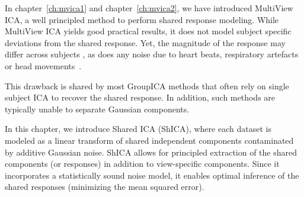 In chapter~\ref{ch:mvica1} and chapter~\ref{ch:mvica2}, we have introduced MultiView ICA, a well principled method to perform shared response modeling. 
While MultiView ICA yields good practical results, it does not model subject specific deviations from the shared
response. Yet, the magnitude of the response may differ across subjects \cite{penny2007random}, as does any noise due to heart beats, respiratory artefacts or head movements~\cite{liu2016noise}.
%

This drawback is shared by most GroupICA methods that often rely on single
subject ICA to recover the shared response. In addition, such methods are typically unable to separate Gaussian components.



In this chapter, we introduce Shared ICA (ShICA), where each dataset is modeled as a linear transform of shared independent components contaminated by additive Gaussian noise. ShICA allows for principled extraction of the shared components (or responses) in addition to view-specific components. 
%
Since it incorporates a statistically sound noise model, it enables optimal
inference of the shared responses (minimizing the mean squared error).

